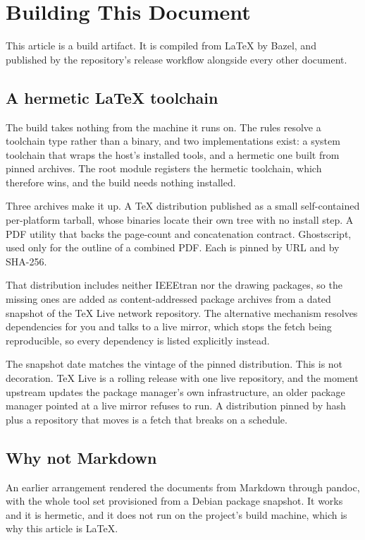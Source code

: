 \section{Building This Document}
\label{sec:building}

This article is a build artifact. It is compiled from LaTeX by Bazel, and
published by the repository's release workflow alongside every other
document.

\subsection{A hermetic LaTeX toolchain}

The build takes nothing from the machine it runs on. The rules resolve a
toolchain type rather than a binary, and two implementations exist: a system
toolchain that wraps the host's installed tools, and a hermetic one built
from pinned archives. The root module registers the hermetic toolchain,
which therefore wins, and the build needs nothing installed.

Three archives make it up. A TeX distribution published as a small
self-contained per-platform tarball, whose binaries locate their own tree
with no install step. A PDF utility that backs the page-count and
concatenation contract. Ghostscript, used only for the outline of a combined
PDF. Each is pinned by URL and by SHA-256.

That distribution includes neither IEEEtran nor the drawing packages, so the
missing ones are added as content-addressed package archives from a dated
snapshot of the TeX Live network repository. The alternative mechanism
resolves dependencies for you and talks to a live mirror, which stops the
fetch being reproducible, so every dependency is listed explicitly instead.

The snapshot date matches the vintage of the pinned distribution. This is
not decoration. TeX Live is a rolling release with one live repository, and
the moment upstream updates the package manager's own infrastructure, an
older package manager pointed at a live mirror refuses to run. A
distribution pinned by hash plus a repository that moves is a fetch that
breaks on a schedule.

\subsection{Why not Markdown}

An earlier arrangement rendered the documents from Markdown through pandoc,
with the whole tool set provisioned from a Debian package snapshot. It works
and it is hermetic, and it does not run on the project's build machine,
which is why this article is LaTeX.

